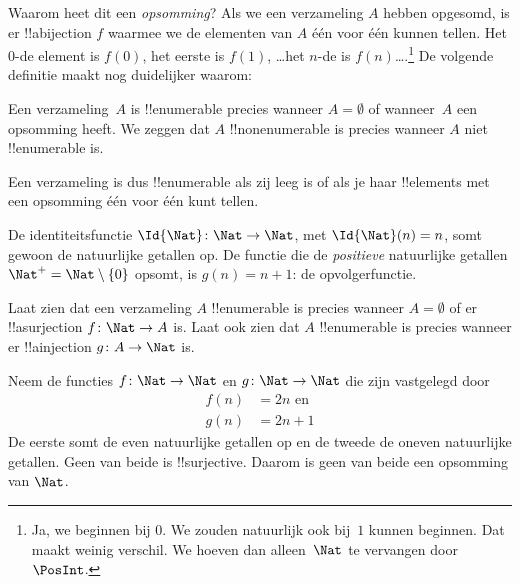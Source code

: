 \documentclass[openany]{memoir}
\begin{document}
\begin{explain}
Waarom heet dit een \emph{opsomming}? Als we een verzameling $A$
hebben opgesomd, is er !!a{bijection} $f$ waarmee we de elementen van
$A$ één voor één kunnen tellen. Het $0$-de element is $f(0)$, het
eerste is $f(1)$, \ldots het $n$-de is $f(n)$\ldots.\footnote{Ja, we
beginnen bij $0$. We zouden natuurlijk ook bij~$1$ kunnen beginnen.
Dat maakt weinig verschil. We hoeven dan alleen~$\Nat$ te vervangen
door~$\PosInt$.} De volgende definitie maakt nog duidelijker waarom:
\end{explain}

\begin{defn}
  Een verzameling~$A$ is !!{enumerable} precies wanneer $A =
  \emptyset$ of wanneer~$A$ een opsomming heeft. We zeggen dat $A$
  !!{nonenumerable} is precies wanneer $A$ niet !!{enumerable} is.
\end{defn}

\begin{explain}
Een verzameling is dus !!{enumerable} als zij leeg is of als je haar
!!{element}s met een opsomming één voor één kunt tellen.
\end{explain}

\begin{ex}
De identiteitsfunctie $\Id{\Nat} \colon \Nat \to \Nat$, met
$\Id{\Nat}(n) = n$, somt gewoon de natuurlijke getallen op. De functie
die de \emph{positieve} natuurlijke getallen $\Nat^+ = \Nat \setminus
\{0\}$ opsomt, is $g(n) = n + 1$: de opvolgerfunctie.
\end{ex}

\begin{prob}
Laat zien dat een verzameling $A$ !!{enumerable} is precies wanneer
$A = \emptyset$ of er !!a{surjection} $f\colon \Nat \to A$ is. Laat
ook zien dat $A$ !!{enumerable} is precies wanneer er !!a{injection}
$g\colon A \to \Nat$ is.
\end{prob}

\begin{ex}
Neem de functies $f\colon \Nat \to \Nat$ en $g \colon \Nat \to \Nat$
die zijn vastgelegd door
\begin{align*}
  f(n) & = 2n \text{ en}\\
  g(n) & = 2n+1
\end{align*}
De eerste somt de even natuurlijke getallen op en de tweede de oneven
natuurlijke getallen. Geen van beide is !!{surjective}. Daarom is
geen van beide een opsomming van $\Nat$.
\end{ex}
\end{document}
